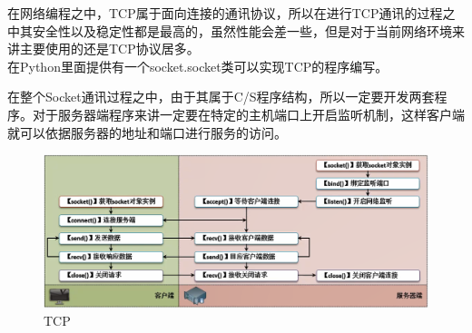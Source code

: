 在网络编程之中，TCP属于面向连接的通讯协议，所以在进行TCP通讯的过程之中其安全性以及稳定性都是最高的，虽然性能会差一些，但是对于当前网络环境来讲主要使用的还是TCP协议居多。\\

在Python里面提供有一个socket.socket类可以实现TCP的程序编写。

\begin{table}[H]
	\centering
	\caption{socket.socket类}
\end{table}

在整个Socket通讯过程之中，由于其属于C/S程序结构，所以一定要开发两套程序。对于服务器端程序来讲一定要在特定的主机端口上开启监听机制，这样客户端就可以依据服务器的地址和端口进行服务的访问。

\begin{figure}[H]
	\centering
	\includegraphics[scale=0.6]{img/C12/12-2/1.png}
	\caption{TCP}
\end{figure}

